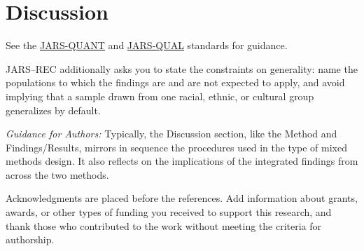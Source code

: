 \documentclass[acmsmall,screen,anonymous,review]{acmart}
\begin{document}
\section{Discussion}
See the \href{https://apastyle.apa.org/jars/quantitative}{JARS-QUANT} and \href{https://apastyle.apa.org/jars/qualitative}{JARS-QUAL} standards for guidance.


JARS--REC additionally asks you to state the constraints on generality: name the populations to which the findings are and are not expected to apply, and avoid implying that a sample drawn from one racial, ethnic, or cultural group generalizes by default.

\textit{Guidance for Authors:} Typically, the Discussion section, like the Method and Findings/Results, mirrors in sequence the procedures used in the type of mixed methods design. It also reflects on the implications of the integrated findings from across the two methods. 

\begin{acks}
Acknowledgments are placed before the references. Add information about grants, awards, or other types of funding you received to support this research, and thank those who contributed to the work without meeting the criteria for authorship.
\end{acks}




\appendix
\end{document}
